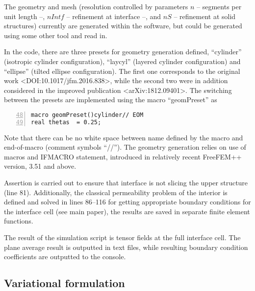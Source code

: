 \documentclass[12pt,a4paper]{article}
\begin{document}
The geometry and mesh (resolution controlled by parameters $n$ -- segments per unit length --, $nIntf$ -- 
refinement at interface --, and $nS$ -- refinement at solid structures) currently
are generated within the software, but could be generated using some other tool and read in.

In the code, there are three presets for geometry generation defined, ``cylinder'' (isotropic cylinder
configuration), ``laycyl'' (layered cylinder configuration) and ``ellipse'' (tilted ellipse configuration).
The first one corresponds to the original work <DOI:10.1017/jfm.2016.838>, while the second two were
in addition considered in the improved publication <arXiv:1812.09401>. The switching between the presets
are implemented using the macro ``geomPreset'' as
\begin{lstlisting}[numbers=left,firstnumber=48]
macro geomPreset()cylinder// EOM
real thetas  = 0.25;
\end{lstlisting}
Note that there can be no white space between name defined by the macro and end-of-macro (comment symbols
``//''). The geometry generation relies on use of macros and IFMACRO statement, introduced in relatively
recent FreeFEM++ version, 3.51 and above.

Assertion is carried out to ensure that interface is not slicing the upper structure (line 81).
Additionally, the classical permeability problem of the interior is defined and solved in lines 86--116 for
getting appropriate boundary conditions for the interface cell (see main paper), the results are saved in
separate finite element functions.

The result of the simulation script is tensor fields at the full interface cell. The plane average result is
outputted in text files, while resulting boundary condition coefficients are outputted to the console.

\subsection{Variational formulation}
\end{document}
